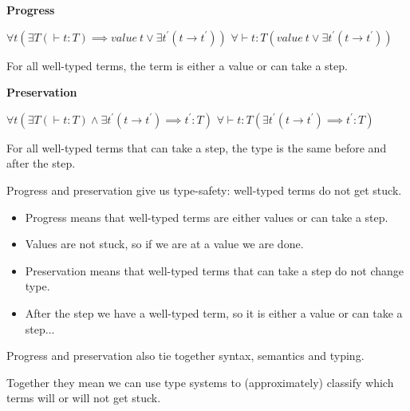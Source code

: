 \begin{frame}[c]

  {\bf Progress}

  \bigskip

  \begin{overprint}
  $\forall t \left(\exists T \left(\vdash t {:} T\right) \implies value~t \vee \exists t^{\prime}\left(t \longrightarrow t^{\prime}\right)\right)$
%
  $\forall \vdash t {:} T \left( value~t \vee \exists t^{\prime}\left(t \longrightarrow t^{\prime}\right)\right)$
  \end{overprint}

  \bigskip

  \begin{overprint}
  For all well-typed terms, the term is either a value or can take a step.
  \end{overprint}
\end{frame}

\begin{frame}[c]

  {\bf Preservation}

  \bigskip

  \begin{overprint}
  $\forall t \left( \exists T \left( \vdash t {:} T\right) \wedge \exists t^{\prime} \left(t \longrightarrow t^{\prime}\right) \implies t^{\prime} {:} T \right)$
%
  $\forall \vdash t {:} T \left(\exists t^{\prime} \left(t \longrightarrow t^{\prime}\right) \implies t^{\prime} {:} T \right)$
  \end{overprint}

  \bigskip

  \begin{overprint}
    For all well-typed terms that can take a step, the type is the same before
    and after the step.
  \end{overprint}
\end{frame}

\begin{frame}[c]
  Progress and preservation give us type-safety: well-typed terms do not get stuck.
  \begin{itemize}
  \pause
  \item<+-> Progress means that well-typed terms are either values or can take a step.
  \item<+-> Values are not stuck, so if we are at a value we are done.
  \item<+-> Preservation means that well-typed terms that can take a step do not change type.
  \item<+-> After the step we have a well-typed term, so it is either a value or can
    take a step...
  \end{itemize}
\end{frame}

\begin{frame}[c]
  Progress and preservation also tie together syntax, semantics and typing.
\end{frame}

\begin{frame}[c]
  Together they mean we can use type systems to (approximately) classify which terms will or will not get stuck.
\end{frame}